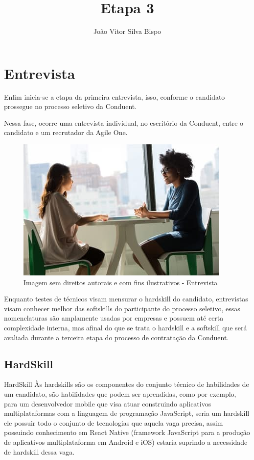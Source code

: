 \documentclass[12pt]{article}
\author{João Vitor Silva Bispo}
\title{Etapa 3}
\begin{document}
\maketitle

\section{Entrevista}
Enfim inicia-se a etapa da primeira entrevista, isso, conforme o candidato prossegue no processo seletivo da Conduent. 

Nessa fase, ocorre uma entrevista individual, no escritório da Conduent, entre o candidato e um recrutador da Agile One.

\begin{figure}[h]
	\centering
	\includegraphics[scale=0.5]{interview}
	\caption{Imagem sem direitos autorais e com fins ilustrativos - Entrevista}
	\label{fig:mesh1}
\end{figure}
Enquanto testes de técnicos visam mensurar o hardskill do candidato, entrevistas visam conhecer melhor das softskills do participante do processo seletivo, essas nomenclaturas são amplamente usadas por empresas e possuem até certa complexidade interna, mas afinal do que se trata o hardskill e a softskill que será avaliada durante a terceira etapa do processo de contratação da Conduent.

\subsection{HardSkill}
HardSkill
Às hardskills são os componentes do conjunto técnico de habilidades de um candidato, são habilidades que podem ser aprendidas, como por exemplo, para um desenvolvedor mobile que visa atuar construindo aplicativos multiplataformas com a linguagem de programação JavaScript, seria um hardskill ele possuir todo o conjunto de tecnologias que aquela vaga precisa, assim possuindo conhecimento em React Native (framework JavaScript para a produção de aplicativos multiplataforma em Android e iOS) estaria suprindo a necessidade de hardskill dessa vaga. 
\end{document}
